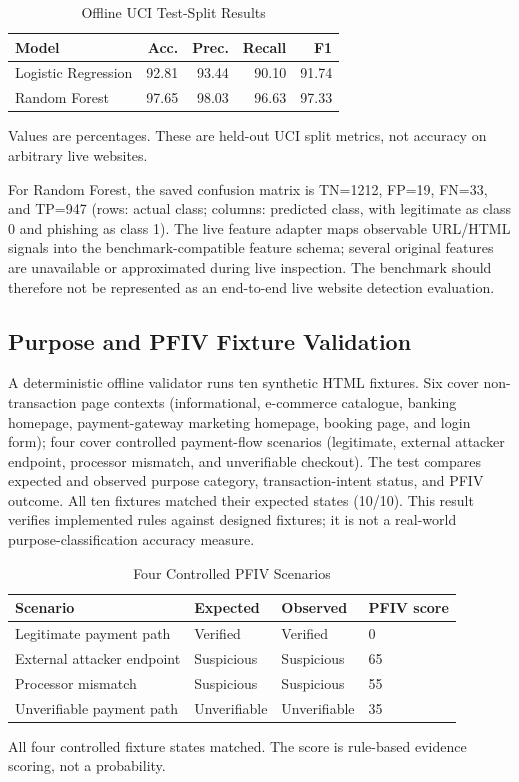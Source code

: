 \documentclass[conference]{IEEEtran}
\begin{document}
\begin{table}[t]
\caption{Offline UCI Test-Split Results}
\label{tab:ml}
\centering
\scriptsize
\begin{tabular}{lrrrr}
\toprule
Model & Acc. & Prec. & Recall & F1 \\
\midrule
Logistic Regression & 92.81 & 93.44 & 90.10 & 91.74 \\
Random Forest & 97.65 & 98.03 & 96.63 & 97.33 \\
\bottomrule
\end{tabular}
\vspace{1mm}
\parbox{\columnwidth}{\scriptsize Values are percentages. These are held-out UCI split metrics, not accuracy on arbitrary live websites.}
\end{table}

For Random Forest, the saved confusion matrix is TN=1212, FP=19, FN=33, and TP=947 (rows: actual class; columns: predicted class, with legitimate as class 0 and phishing as class 1). The live feature adapter maps observable URL/HTML signals into the benchmark-compatible feature schema; several original features are unavailable or approximated during live inspection. The benchmark should therefore not be represented as an end-to-end live website detection evaluation.

\subsection{Purpose and PFIV Fixture Validation}
A deterministic offline validator runs ten synthetic HTML fixtures. Six cover non-transaction page contexts (informational, e-commerce catalogue, banking homepage, payment-gateway marketing homepage, booking page, and login form); four cover controlled payment-flow scenarios (legitimate, external attacker endpoint, processor mismatch, and unverifiable checkout). The test compares expected and observed purpose category, transaction-intent status, and PFIV outcome. All ten fixtures matched their expected states (10/10). This result verifies implemented rules against designed fixtures; it is not a real-world purpose-classification accuracy measure.

\begin{table}[t]
\caption{Four Controlled PFIV Scenarios}
\label{tab:pfiv}
\centering
\scriptsize
\begin{tabularx}{\columnwidth}{@{}Xlll@{}}
\toprule
Scenario & Expected & Observed & PFIV score \\
\midrule
Legitimate payment path & Verified & Verified & 0 \\
External attacker endpoint & Suspicious & Suspicious & 65 \\
Processor mismatch & Suspicious & Suspicious & 55 \\
Unverifiable payment path & Unverifiable & Unverifiable & 35 \\
\bottomrule
\end{tabularx}
\vspace{1mm}
\parbox{\columnwidth}{\scriptsize All four controlled fixture states matched. The score is rule-based evidence scoring, not a probability.}
\end{table}
\end{document}
